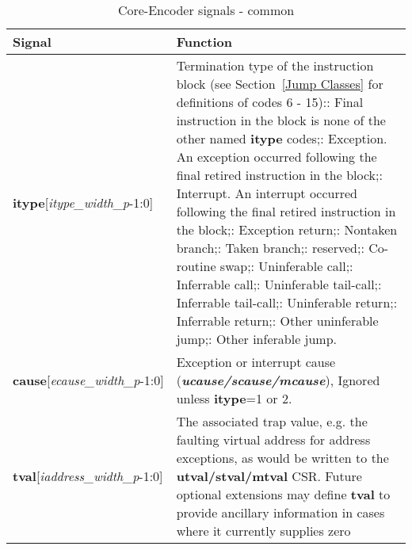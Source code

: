 \begin{table}[htp]
    \centering
    \caption{Core-Encoder signals - common}
    \label{tab:common-ingress}
    \begin{tabulary}{\textwidth}{|l|p{80mm}|}
        \hline
        \textbf {Signal} & \textbf {Function} \\
        \hline
        \textbf{itype}[\textit{itype\_width\_p}-1:0] & Termination type of the instruction block (see Section~\ref{Jump Classes} for definitions of codes 6 - 15):: Final instruction in the block is none of the other named \textbf{itype} codes;: Exception. An exception occurred following the final retired instruction in the block;: Interrupt. An interrupt occurred following the final retired instruction in the block;: Exception return;: Nontaken branch;: Taken branch;: reserved;: Co-routine swap;: Uninferable call;: Inferrable call;: Uninferable tail-call;: Inferrable tail-call;: Uninferable return;: Inferrable return;: Other uninferable jump;: Other inferable jump.\\
        \hline
        \textbf{cause}[\textit{ecause\_width\_p}-1:0] & Exception or interrupt cause (\textbf{\textit{ucause/scause/mcause}}), \newline
        Ignored unless \textbf {itype}=1 or 2.\\
        \hline
        \textbf{tval}[\textit{iaddress\_width\_p}-1:0]& The associated trap value, e.g. the
    faulting virtual address for address exceptions, as would be
    written to the \textbf{utval/stval/mtval} CSR. Future optional extensions may define \textbf{tval} to provide ancillary information in cases where it currently supplies zero\newline

\end{tabulary}
\end{table}
